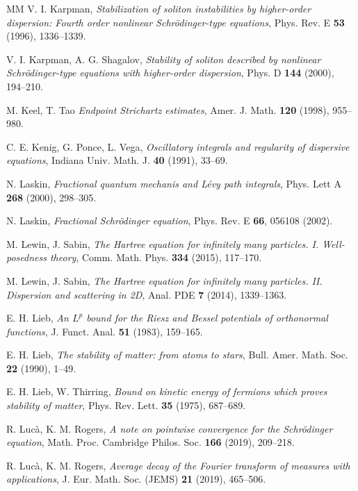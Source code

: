 \documentclass[a4paper]{amsart}
\numberwithin{equation}{section}%
\theoremstyle{plain}%
\theoremstyle{definition}
\theoremstyle{remark}%
\begin{document}
\begin{thebibliography}{MM}
V. I. Karpman, \textit{Stabilization of soliton instabilities by higher-order dispersion: Fourth order nonlinear Schr\"odinger-type
equations}, Phys. Rev. E \textbf{53} (1996), 1336--1339.

 V. I. Karpman, A. G. Shagalov, \textit{Stability of soliton described by nonlinear Schr\"odinger-type equations with higher-order
dispersion}, Phys. D \textbf{144} (2000), 194--210.

 M. Keel, T. Tao \textit{Endpoint Strichartz estimates}, Amer. J. Math. \textbf{120} (1998), 955--980.

 C. E. Kenig, G. Ponce, L. Vega, \textit{Oscillatory integrals and regularity of dispersive equations}, Indiana Univ. Math. J. \textbf{40} (1991), 33--69.

N. Laskin, \textit{Fractional quantum mechanis and Lévy path integrals}, Phys. Lett A \textbf{268} (2000), 298--305.

N. Laskin, \textit{Fractional Schrödinger equation}, Phys. Rev. E \textbf{66}, 056108 (2002).

 M. Lewin, J. Sabin, \textit{The Hartree equation for infinitely many particles. I. Well-posedness theory}, Comm. Math. Phys. \textbf{334} (2015), 117--170.

 M. Lewin, J. Sabin, \textit{The Hartree equation for infinitely many particles. II. Dispersion and scattering in 2D}, Anal. PDE \textbf{7} (2014), 1339--1363.

 E. H. Lieb, \textit{An $L^p$ bound for the Riesz and Bessel potentials of orthonormal functions}, J. Funct. Anal. \textbf{51} (1983), 159--165.

 E. H. Lieb, \textit{The stability of matter: from atoms to stars}, Bull. Amer. Math. Soc. \textbf{22} (1990), 1--49.

 E. H. Lieb, W. Thirring, \textit{Bound on kinetic energy of fermions which proves stability of matter}, Phys. Rev. Lett. \textbf{35} (1975), 687--689.


R. Luc\`{a},
K. M. Rogers,
\textit{A note on pointwise convergence for the Schr\"odinger equation},
Math. Proc. Cambridge Philos. Soc. \textbf{166} (2019), 209--218.

R. Luc\`{a},
K. M.  Rogers, 
\textit{Average decay of the Fourier transform of measures with applications},
J. Eur. Math. Soc. (JEMS) \textbf{21} (2019), 465--506.




\end{thebibliography}
\end{document}
